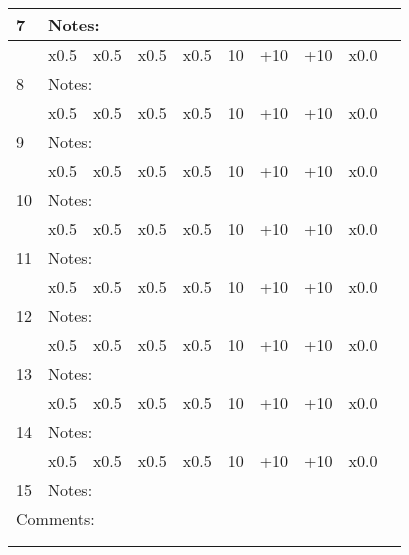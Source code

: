 \documentclass{article}
\begin{document}
\begin{center}
\begin{tabular}{|m{0.4cm}|m{0.8cm}|m{1.2cm}|m{1cm}|m{1cm}|m{0.8cm}|m{0.8cm}|m{1cm}|m{0.8cm}|m{0.8cm}|}
    \cline{2-9}
    7 & \multicolumn{8}{|l|}{Notes: }&\\
    \hline
     & \multicolumn{1}{|c|}{x0.5} & \multicolumn{1}{|c|}{x0.5} & \multicolumn{1}{|c|}{x0.5} & \multicolumn{1}{|c|}{x0.5}& 10& +10& +10& x0.0&\\
    \cline{2-9}
    8 & \multicolumn{8}{|l|}{Notes: }&\\
    \hline
     & \multicolumn{1}{|c|}{x0.5} & \multicolumn{1}{|c|}{x0.5} & \multicolumn{1}{|c|}{x0.5} & \multicolumn{1}{|c|}{x0.5}& 10& +10& +10& x0.0&\\
    \cline{2-9}
    9 & \multicolumn{8}{|l|}{Notes: }&\\
    \hline
     & \multicolumn{1}{|c|}{x0.5} & \multicolumn{1}{|c|}{x0.5} & \multicolumn{1}{|c|}{x0.5} & \multicolumn{1}{|c|}{x0.5}& 10& +10& +10& x0.0&\\
    \cline{2-9}
    10 & \multicolumn{8}{|l|}{Notes: }&\\
    \hline
     & \multicolumn{1}{|c|}{x0.5} & \multicolumn{1}{|c|}{x0.5} & \multicolumn{1}{|c|}{x0.5} & \multicolumn{1}{|c|}{x0.5}& 10& +10& +10& x0.0&\\
    \cline{2-9}
    11 & \multicolumn{8}{|l|}{Notes: }&\\
    \hline
     & \multicolumn{1}{|c|}{x0.5} & \multicolumn{1}{|c|}{x0.5} & \multicolumn{1}{|c|}{x0.5} & \multicolumn{1}{|c|}{x0.5}& 10& +10& +10& x0.0&\\
    \cline{2-9}
    12 & \multicolumn{8}{|l|}{Notes: }&\\
    \hline
     & \multicolumn{1}{|c|}{x0.5} & \multicolumn{1}{|c|}{x0.5} & \multicolumn{1}{|c|}{x0.5} & \multicolumn{1}{|c|}{x0.5}& 10& +10& +10& x0.0&\\
    \cline{2-9}
    13 & \multicolumn{8}{|l|}{Notes: }&\\
    \hline
     & \multicolumn{1}{|c|}{x0.5} & \multicolumn{1}{|c|}{x0.5} & \multicolumn{1}{|c|}{x0.5} & \multicolumn{1}{|c|}{x0.5}& 10& +10& +10& x0.0&\\
    \cline{2-9}
    14 & \multicolumn{8}{|l|}{Notes: }&\\
    \hline
     & \multicolumn{1}{|c|}{x0.5} & \multicolumn{1}{|c|}{x0.5} & \multicolumn{1}{|c|}{x0.5} & \multicolumn{1}{|c|}{x0.5}& 10& +10& +10& x0.0&\\
    \cline{2-9}
    15 & \multicolumn{8}{|l|}{Notes: }&\\
    \hline
    \multicolumn{10}{|l|}{Comments:} \\ 
    \multicolumn{10}{|l|}{} \\
    \multicolumn{10}{|l|}{} \\
    \hline
\end{tabular}
\end{center}
\end{document}
